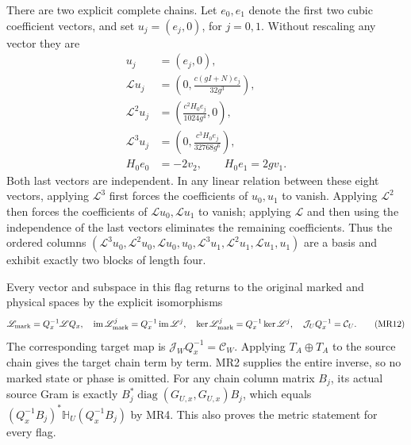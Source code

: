 \documentclass[11pt]{article}
\begin{document}
There are two explicit complete chains. Let $e_0,e_1$
denote the first two cubic coefficient vectors, and set
$u_j=(e_j,0)$, for $j=0,1$. Without rescaling any vector they are
\begin{equation}
 \begin{split}
 u_j&=(e_j,0),\\
 \mathscr L u_j&=\left(0,\frac{c(gI+N)e_j}{32g^3}\right),\\
 \mathscr L^2u_j&=\left(\frac{c^2H_0e_j}{1024g^4},0\right),\\
 \mathscr L^3u_j&=\left(0,\frac{c^3H_0e_j}{32768g^6}\right),\\
 H_0e_0&=-2v_2,\qquad H_0e_1=2gv_1.
 \end{split}\tag{MR11}
\end{equation}
Both last vectors are independent. In any linear relation
between these eight vectors, applying $\mathscr L^3$ first
forces the coefficients of $u_0,u_1$ to vanish. Applying
$\mathscr L^2$ then forces the coefficients of
$\mathscr L u_0,\mathscr L u_1$ to vanish; applying
$\mathscr L$ and then using the independence of the last
vectors eliminates the remaining coefficients. Thus the
ordered columns
$(\mathscr L^3u_0,\mathscr L^2u_0,\mathscr L u_0,u_0,
  \mathscr L^3u_1,\mathscr L^2u_1,\mathscr L u_1,u_1)$
are a basis and exhibit exactly two blocks of length four.

Every vector and subspace in this flag returns to the original
marked and physical spaces by the explicit isomorphisms
\begin{equation}
 \mathscr L_{\rm mark}=Q_x^{-1}\mathscr LQ_x,
 \quad \operatorname{im}\mathscr L_{\rm mark}^j
       =Q_x^{-1}\operatorname{im}\mathscr L^j,
 \quad \ker\mathscr L_{\rm mark}^j
       =Q_x^{-1}\ker\mathscr L^j,
 \quad \mathcal J_UQ_x^{-1}=\mathcal C_U.
 \tag{MR12}
\end{equation}
The corresponding target map is $\mathcal J_WQ_x^{-1}
=\mathcal C_W$. Applying $T_A\oplus T_A$ to the source
chain gives the target chain term by term. MR2 supplies the
entire inverse, so no marked state or phase is omitted.
For any chain column matrix $B_j$, its actual source Gram
is exactly $B_j^*\operatorname{diag}(G_{U,x},G_{U,x})B_j$,
which equals $(Q_x^{-1}B_j)^*\mathbb H_U(Q_x^{-1}B_j)$
by MR4. This also proves the metric statement for every flag.
\end{document}
